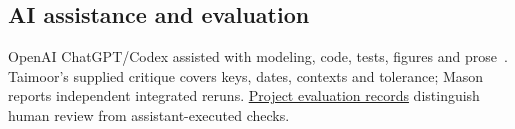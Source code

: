 \documentclass[sigconf,nonacm]{acmart}
\begin{document}
\subsection{AI assistance and evaluation}
OpenAI ChatGPT/Codex assisted with modeling, code, tests, figures and
prose~\cite{openaiAssistance}. Taimoor's supplied critique covers keys, dates,
contexts and tolerance; Mason reports independent integrated reruns.
\href{https://github.com/Pyrex111/CSC501_Data_Modeling_Project/tree/main/milestones/04_relational}{Project evaluation records}
distinguish human review from assistant-executed checks.


\clearpage

\end{document}
